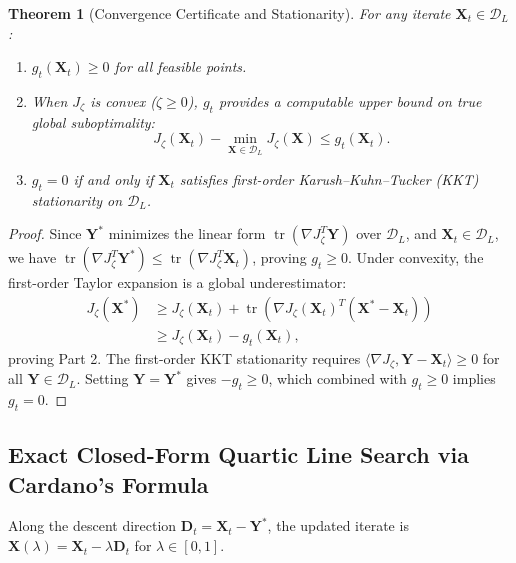 \documentclass[a4paper,fleqn]{cas-dc}
\theoremstyle{thmstyleone}
\newtheorem{theorem}{Theorem}
\theoremstyle{thmstyletwo}
\theoremstyle{thmstylethree}
\begin{document}
\begin{theorem}[Convergence Certificate and Stationarity]
\label{thm:duality_gap}
For any iterate $\mathbf{X}_t \in \mathcal{D}_L$:
\begin{enumerate}
    \item $g_t(\mathbf{X}_t) \ge 0$ for all feasible points.
    \item When $J_\zeta$ is convex ($\zeta \ge 0$), $g_t$ provides a computable upper bound on true global suboptimality:
    \begin{equation}
    J_\zeta(\mathbf{X}_t) - \min_{\mathbf{X} \in \mathcal{D}_L} J_\zeta(\mathbf{X}) \le g_t(\mathbf{X}_t).
    \label{eq:gap_bound}
    \end{equation}
    \item $g_t = 0$ if and only if $\mathbf{X}_t$ satisfies first-order Karush--Kuhn--Tucker (KKT) stationarity on $\mathcal{D}_L$.
\end{enumerate}
\end{theorem}
\begin{proof}
Since $\mathbf{Y}^*$ minimizes the linear form $\operatorname{tr}(\nabla J_\zeta^T \mathbf{Y})$ over $\mathcal{D}_L$, and $\mathbf{X}_t \in \mathcal{D}_L$, we have $\operatorname{tr}(\nabla J_\zeta^T \mathbf{Y}^*) \le \operatorname{tr}(\nabla J_\zeta^T \mathbf{X}_t)$, proving $g_t \ge 0$. Under convexity, the first-order Taylor expansion is a global underestimator:
\begin{align}
J_\zeta(\mathbf{X}^*) &\ge J_\zeta(\mathbf{X}_t) + \operatorname{tr}\left( \nabla J_\zeta(\mathbf{X}_t)^T (\mathbf{X}^* - \mathbf{X}_t) \right) \nonumber \\
&\ge J_\zeta(\mathbf{X}_t) - g_t(\mathbf{X}_t),
\end{align}
proving Part 2. The first-order KKT stationarity requires $\langle \nabla J_\zeta, \mathbf{Y} - \mathbf{X}_t \rangle \ge 0$ for all $\mathbf{Y} \in \mathcal{D}_L$. Setting $\mathbf{Y} = \mathbf{Y}^*$ gives $-g_t \ge 0$, which combined with $g_t \ge 0$ implies $g_t = 0$.
\end{proof}

\subsection{Exact Closed-Form Quartic Line Search via Cardano's Formula}
Along the descent direction $\mathbf{D}_t = \mathbf{X}_t - \mathbf{Y}^*$, the updated iterate is $\mathbf{X}(\lambda) = \mathbf{X}_t - \lambda \mathbf{D}_t$ for $\lambda \in [0, 1]$.
\end{document}
